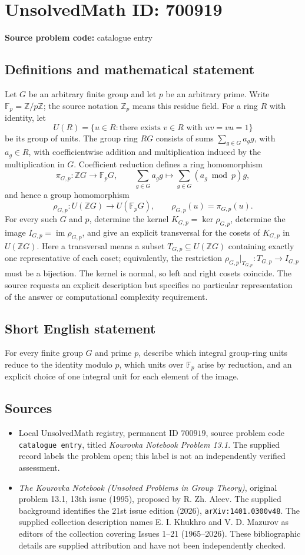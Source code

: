 \documentclass[11pt]{article}
\newcommand{\Z}{\mathbb{Z}}
\newcommand{\F}{\mathbb{F}}
\begin{document}
\section*{UnsolvedMath ID: 700919}
\textbf{Source problem code:} catalogue entry
\subsection{Definitions and mathematical statement}
Let \(G\) be an arbitrary finite group and let \(p\) be an arbitrary prime. Write \(\F_p=\Z/p\Z\); the source notation \(\Z_p\) means this residue field. For a ring \(R\) with identity, let
\[
U(R)=\{u\in R:\text{there exists }v\in R\text{ with }uv=vu=1\}
\]
be its group of units. The group ring \(RG\) consists of sums \(\sum_{g\in G}a_g g\), with \(a_g\in R\), with coefficientwise addition and multiplication induced by the multiplication in \(G\). Coefficient reduction defines a ring homomorphism
\[
\pi_{G,p}:\Z G\longrightarrow\F_pG,
\qquad
\sum_{g\in G}a_g g\longmapsto\sum_{g\in G}(a_g\bmod p)g,
\]
and hence a group homomorphism
\[
\rho_{G,p}:U(\Z G)\longrightarrow U(\F_pG),
\qquad \rho_{G,p}(u)=\pi_{G,p}(u).
\]
For every such \(G\) and \(p\), determine the kernel \(K_{G,p}=\ker\rho_{G,p}\), determine the image \(I_{G,p}=\operatorname{im}\rho_{G,p}\), and give an explicit transversal for the cosets of \(K_{G,p}\) in \(U(\Z G)\). Here a transversal means a subset \(T_{G,p}\subseteq U(\Z G)\) containing exactly one representative of each coset; equivalently, the restriction \(\rho_{G,p}|_{T_{G,p}}:T_{G,p}\to I_{G,p}\) must be a bijection. The kernel is normal, so left and right cosets coincide. The source requests an explicit description but specifies no particular representation of the answer or computational complexity requirement.
\subsection{Short English statement}
For every finite group \(G\) and prime \(p\), describe which integral group-ring units reduce to the identity modulo \(p\), which units over \(\F_p\) arise by reduction, and an explicit choice of one integral unit for each element of the image.
\subsection{Sources}
\begin{itemize}
\item Local UnsolvedMath registry, permanent ID \(700919\), source problem code \texttt{catalogue entry}, titled \emph{Kourovka Notebook Problem 13.1}. The supplied record labels the problem open; this label is not an independently verified assessment.
\item \emph{The Kourovka Notebook (Unsolved Problems in Group Theory)}, original problem 13.1, 13th issue (1995), proposed by R. Zh. Aleev. The supplied background identifies the 21st issue edition (2026), \texttt{arXiv:1401.0300v48}. The supplied collection description names E. I. Khukhro and V. D. Mazurov as editors of the collection covering Issues 1--21 (1965--2026). These bibliographic details are supplied attribution and have not been independently checked.
\end{itemize}
\end{document}

